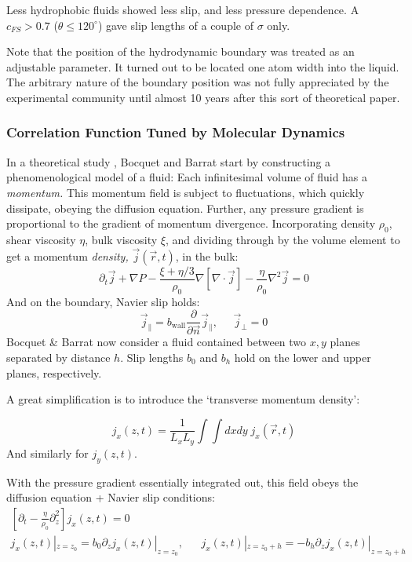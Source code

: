 \documentclass[12pt, a4paper, twoside, openright]{book}
\begin{document}
Less hydrophobic fluids showed less slip, and less pressure dependence. A $c_{FS}>0.7$ ($\theta \leq 120^{\circ}$) gave slip lengths of a couple of $\sigma$ only.

Note that the position of the hydrodynamic boundary was treated as an adjustable parameter.  It turned out to be located one atom width into the liquid.  The arbitrary nature of the boundary position was not fully appreciated by the experimental community until almost 10 years after this sort of theoretical paper.

\subsubsection{Correlation Function Tuned by Molecular Dynamics}

In a theoretical study \cite{BocquetBarrat1994}, Bocquet and Barrat start by constructing a phenomenological model of a fluid: Each infinitesimal volume of fluid has a \emph{momentum.} This momentum field is subject to fluctuations, which quickly dissipate, obeying the diffusion equation. Further, any pressure gradient is proportional to the gradient of momentum divergence. Incorporating density $\rho_0$, shear viscosity $\eta$, bulk viscosity $\xi$, and dividing through by the volume element to get a momentum \emph{density,} $\vec{j}(\vec{r},t)$, in the bulk:
\begin{equation}
 \partial_{t} \vec{j}+\nabla P - \frac{\xi+\eta/3}{\rho_{0}}\nabla
 [\nabla \cdot \vec{j}] - \frac{\eta}{\rho_{0}} \nabla^{2} \vec{j} = 0
\end{equation}
And on the boundary, Navier slip holds:
\begin{equation}
\vec{j}_{\parallel} = b_{\mathrm{wall}} \frac{\partial}{\partial \vec{n}}
 \vec{j}_{\parallel} , \;\;\;\;\; \vec{j}_{\perp} = 0
\end{equation}
Bocquet \& Barrat now consider a fluid contained between two $x,y$ planes separated by distance $h$. Slip lengths $b_{0}$ and $b_{h}$ hold on the lower and upper planes, respectively.

A great simplification is to introduce the `transverse momentum density':

\begin{equation}
j_{x}(z,t) = \frac{1}{L_{x}L_{y}} \int \int dx dy \; j_{x}(\vec{r},t)
\end{equation}
And similarly for $j_{y}(z,t)$.

With the pressure gradient essentially integrated out, this field obeys the diffusion equation + Navier slip conditions:
\begin{gather}
\left[ \partial_{t} - \frac{\eta}{\rho_{0}} \partial_{z}^{2} \right]
j_{x}(z,t) = 0
\\
j_{x}(z,t)|_{z=z_{0}} = b_{0} \partial_{z} j_{x}(z,t)|_{z=z_{0}} , \;\;\;\
\;\;  j_{x}(z,t)|_{z=z_{0}+h} = -b_{h} \partial_{z} j_{x}(z,t)|_{z=z_{0}+h}
\end{gather}
\end{document}
